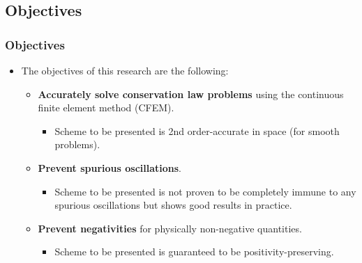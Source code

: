 \documentclass{beamer}
\begin{document}
\subsection{Objectives}
\begin{frame}
\frametitle{Objectives}

\begin{itemize}
   \item The objectives of this research are the following:
   \begin{itemize}
      \item \textbf{Accurately solve conservation law problems} using the
         continuous finite element method (CFEM).
      \begin{itemize}
         \item Scheme to be presented is 2nd order-accurate in space (for smooth
            problems).
      \end{itemize}
      \item \textbf{Prevent spurious oscillations}.
      \begin{itemize}
	 \item Scheme to be presented is not proven to be completely immune to any
            spurious oscillations but shows good results in practice.
      \end{itemize}
      \item \textbf{Prevent negativities} for physically non-negative quantities.
      \begin{itemize}
         \item Scheme to be presented is guaranteed to be positivity-preserving.
      \end{itemize}
   \end{itemize}
\end{itemize}

\end{frame}
\end{document}
